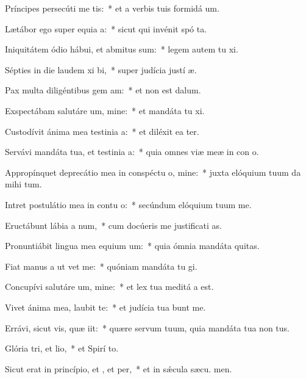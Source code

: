 \item Príncipes persecúti  me tis:~* et a verbis tuis formidá  um.
\item Lætábor ego super equia a:~* sicut qui invénit spó ta.
\item Iniquitátem ódio hábui, et abmitus sum:~* legem autem tu xi.
\item Sépties in die laudem xi bi,~* super judícia justí æ.
\item Pax multa diligéntibus gem am:~* et non est  dalum.
\item Exspectábam salutáre um, mine:~* et mandáta tu xi.
\item Custodívit ánima mea testinia a:~* et diléxit ea ter.
\item Servávi mandáta tua, et testinia a:~* quia omnes viæ meæ in con o.
\item Appropínquet deprecátio mea in conspéctu o, mine:~* juxta elóquium tuum da mihi tum.
\item Intret postulátio mea in contu o:~* secúndum elóquium tuum  me.
\item Eructábunt lábia a num,~* cum docúeris me justificati as.
\item Pronuntiábit lingua mea equium um:~* quia ómnia mandáta  quitas.
\item Fiat manus a ut vet me:~* quóniam mandáta tu gi.
\item Concupívi salutáre um, mine:~* et lex tua meditá a est.
\item Vivet ánima mea,  laubit te:~* et judícia tua bunt me.
\item Errávi, sicut vis, quæ iit:~* quære servum tuum, quia mandáta tua non  tus.
\item Glória tri, et lio,~* et Spirí to.
\item Sicut erat in princípio, et , et per,~* et in sǽcula sæcu. men.
